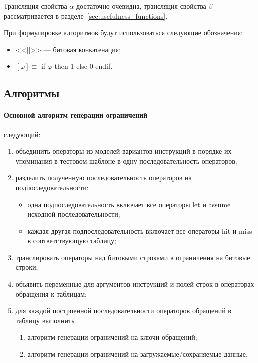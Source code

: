 Трансляция свойства $\alpha$ достаточно очевидна, трансляция свойства $\beta$ рассматривается в разделе~\ref{sec:usefulness_functions}.

При формулировке алгоритмов будут использоваться следующие обозначения:
\begin{itemize}
  \item <<||>> --- битовая конкатенация;
  \item $[\varphi] \equiv $ if $\varphi$ then 1 else 0 endif.
\end{itemize}

\subsection{Алгоритмы}

\paragraph{Основной алгоритм генерации ограничений} следующий:
\begin{enumerate}
    \item объединить операторы из моделей вариантов инструкций в порядке их упоминания в тестовом шаблоне в одну последовательность операторов;
    \item разделить полученную последовательность операторов на
подпоследовательности:
            \begin{itemize}
                \item одна подпоследовательность включает все операторы let и assume исходной последовательности;
                \item каждая другая подпоследовательность включает все операторы hit и miss в соответствующую таблицу;
            \end{itemize}
    \item транслировать операторы над битовыми строками в ограничения на битовые строки;
    \item объявить переменные для аргументов инструкций и полей строк в операторах обращения к таблицам;
    \item для каждой построенной последовательности операторов обращений в таблицу выполнить
            \begin{enumerate}
                \item алгоритм генерации ограничений на ключи обращений;
                \item алгоритм генерации ограничений на загружаемые/сохраняемые данные.
            \end{enumerate}
\end{enumerate}

